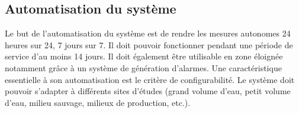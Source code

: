 

\subsection{Automatisation du système}
\label{s:beo_bes_automatsys}

Le but de l’automatisation du système est de rendre les mesures autonomes 24 heures sur 24, 7 jours sur 7.
Il doit pouvoir fonctionner pendant une période de service d’au moins 14 jours.
Il doit également être utilisable en zone éloignée notamment grâce à un système de génération d’alarmes.
Une caractéristique essentielle à son automatisation est le critère de configurabilité.
Le système doit pouvoir s’adapter à différents sites d’études (grand volume d’eau, petit volume d’eau, milieu sauvage, milieux de production, etc.).